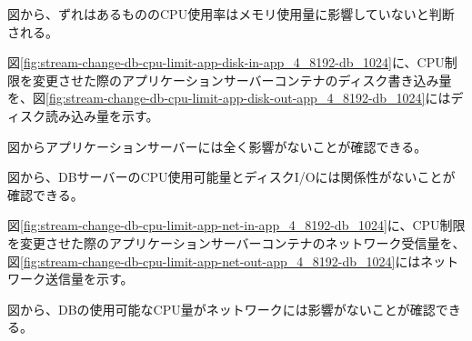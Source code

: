 \documentclass[../../../../main]{subfiles}
\begin{document}
    

    図から、ずれはあるもののCPU使用率はメモリ使用量に影響していないと判断される。


    図\ref{fig:stream-change-db-cpu-limit-app-disk-in-app_4_8192-db_1024}に、CPU制限を変更させた際のアプリケーションサーバーコンテナのディスク書き込み量を、図\ref{fig:stream-change-db-cpu-limit-app-disk-out-app_4_8192-db_1024}にはディスク読み込み量を示す。

    
    

    図からアプリケーションサーバーには全く影響がないことが確認できる。

    
    

    図から、DBサーバーのCPU使用可能量とディスクI/Oには関係性がないことが確認できる。


    図\ref{fig:stream-change-db-cpu-limit-app-net-in-app_4_8192-db_1024}に、CPU制限を変更させた際のアプリケーションサーバーコンテナのネットワーク受信量を、図\ref{fig:stream-change-db-cpu-limit-app-net-out-app_4_8192-db_1024}にはネットワーク送信量を示す。

    
    

    図から、DBの使用可能なCPU量がネットワークには影響がないことが確認できる。
\end{document}
